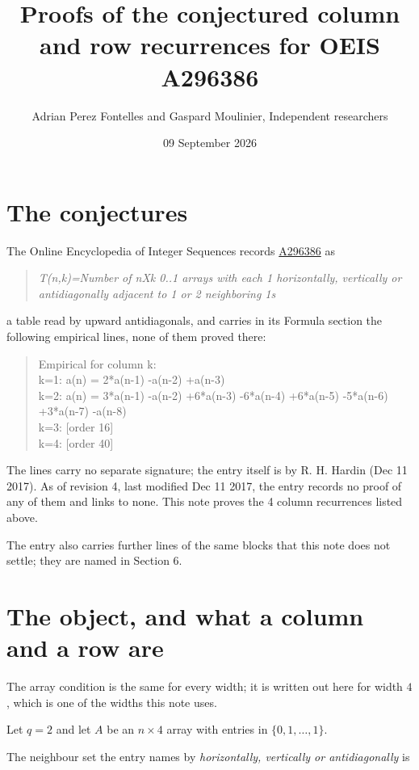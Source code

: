 \documentclass[11pt]{article}
\title{Proofs of the conjectured column and row recurrences for OEIS A296386}
\author{Adrian Perez Fontelles and Gaspard Moulinier, Independent researchers}
\date{09 September 2026}
\theoremstyle{definition}
\begin{document}
\maketitle
\section{The conjectures}

The Online Encyclopedia of Integer Sequences records \href{https://oeis.org/A296386}{A296386} as

\begin{quote}\itshape T(n,k)=Number of nXk 0..1 arrays with each 1 horizontally, vertically or antidiagonally adjacent to 1 or 2 neighboring 1s\end{quote}

a table read by upward antidiagonals, and carries in its Formula section the following empirical lines, none of them proved there:

\begin{quote}\ttfamily Empirical for column k:\\
k=1: a(n) = 2*a(n-1) -a(n-2) +a(n-3)\\k=2: a(n) = 3*a(n-1) -a(n-2) +6*a(n-3) -6*a(n-4) +6*a(n-5) -5*a(n-6) +3*a(n-7) -a(n-8)\\k=3: [order 16]\\k=4: [order 40]\end{quote}

The lines carry no separate signature; the entry itself is by R. H. Hardin (Dec 11 2017). As of revision 4, last modified Dec 11 2017, the entry records no proof of any of them and links to none. This note proves the 4 column recurrences listed above.

The entry also carries further lines of the same blocks that this note does not settle; they are named in Section 6.

\section{The object, and what a column and a row are}

The array condition is the same for every width; it is written out here for width $4$, which is one of the widths this note uses.

Let $q = 2$ and let $A$ be an $n \times 4$ array with entries in $\{0,1,\dots,1\}$.

The neighbour set the entry names by {\itshape horizontally, vertically or antidiagonally} is
\end{document}
